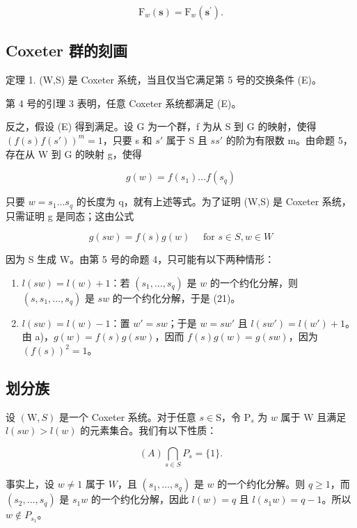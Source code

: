 \[
\mathrm{F} _ {w} (\mathbf {s}) = \mathrm{F} _ {w} (\mathbf {s} ^ {\prime}).
\]

\subsection{Coxeter 群的刻画}

定理 1. (W,S) 是 Coxeter 系统，当且仅当它满足第 5 号的交换条件 (E)。

第 4 号的引理 3 表明，任意 Coxeter 系统都满足 (E)。

反之，假设 (E) 得到满足。设 G 为一个群，f 为从 S 到 G 的映射，使得 \((f(s)f(s'))^{m}=1\)，只要 s 和 \(s'\) 属于 S 且 \(ss'\) 的阶为有限数 m。由命题 5，存在从 W 到 G 的映射 g，使得

\[
g (w) = f (s _ {1}) \dots f (s _ {q})\tag{20}
\]

只要 \(w = s_{1} \ldots s_{q}\) 的长度为 q，就有上述等式。为了证明 (W,S) 是 Coxeter 系统，只需证明 g 是同态；这由公式

\[
g (s w) = f (s) g (w) \quad \text { for } s \in S, w \in W\tag{21}
\]

因为 S 生成 W。由第 5 号的命题 4，只可能有以下两种情形：

\begin{enumerate}
\def\labelenumi{\alph{enumi})}
\item
  \(l(sw) = l(w) + 1\)：若 \((s_1, \ldots, s_q)\) 是 \(w\) 的一个约化分解，则 \((s, s_1, \ldots, s_q)\) 是 \(sw\) 的一个约化分解，于是 (21)。
\item
  \(l(sw) = l(w) - 1\)：置 \(w' = sw\)；于是 \(w = sw'\) 且 \(l(sw') = l(w') + 1\)。由 a)，\(g(w) = f(s)g(sw)\)，因而 \(f(s)g(w) = g(sw)\)，因为 \((f(s))^{2} = 1\)。
\end{enumerate}

\subsection{划分族}

设 \((\mathrm{W}, S)\) 是一个 Coxeter 系统。对于任意 \(s \in \mathrm{S}\)，令 \(\mathrm{P}_s\) 为 \(w\) 属于 \(\mathrm{W}\) 且满足 \(l(sw) > l(w)\) 的元素集合。我们有以下性质：

\[
(A) \bigcap_ {s \in S} P _ {s} = \{1 \}.
\]

事实上，设 \(w \neq 1\) 属于 \(W\)，且 \((s_1, \ldots, s_q)\) 是 \(w\) 的一个约化分解。则 \(q \geqslant 1\)，而 \((s_2, \ldots, s_q)\) 是 \(s_1w\) 的一个约化分解，因此 \(l(w) = q\) 且 \(l(s_1w) = q - 1\)。所以 \(w \notin P_{s_1}\)。

